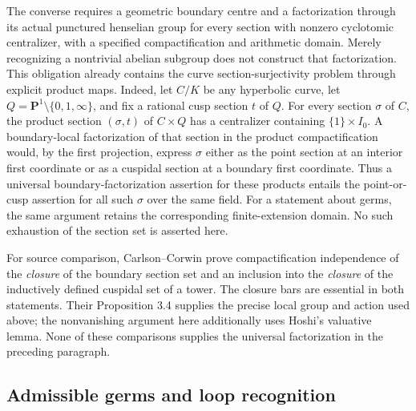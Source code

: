 The converse requires a geometric boundary centre and a factorization
through its actual punctured henselian group for every section with
nonzero cyclotomic centralizer, with a specified compactification and
arithmetic domain. Merely recognizing a nontrivial abelian subgroup
does not construct that factorization. This obligation already contains
the curve section-surjectivity problem through explicit product maps.
Indeed, let $C/K$ be any hyperbolic curve, let $Q=\mathbf
P^1\setminus\{0,1,\infty\}$, and fix a rational cusp section $t$ of
$Q$. For every section $\sigma$ of $C$, the product section
$(\sigma,t)$ of $C\times Q$ has a centralizer containing
$\{1\}\times I_0$. A boundary-local factorization of that section in
the product compactification would, by the first projection, express
$\sigma$ either as the point section at an interior first coordinate
or as a cuspidal section at a boundary first coordinate. Thus a
universal boundary-factorization assertion for these products entails
the point-or-cusp assertion for all such $\sigma$ over the same field.
For a statement about germs, the same argument retains the corresponding
finite-extension domain. No such exhaustion of the section set is
asserted here.

For source comparison, Carlson--Corwin
\cite[Theorem 3.7 and Proposition 4.12]{B_CarlsonCorwin2026} prove
compactification independence of the \emph{closure} of the boundary
section set and an inclusion into the \emph{closure} of the inductively
defined cuspidal set of a tower. The closure bars are essential in both
statements. Their Proposition 3.4 supplies the precise local group and
action used above; the nonvanishing argument here additionally uses
Hoshi's valuative lemma. None of these comparisons supplies the
universal factorization in the preceding paragraph.

\subsection{Admissible germs and loop recognition}

